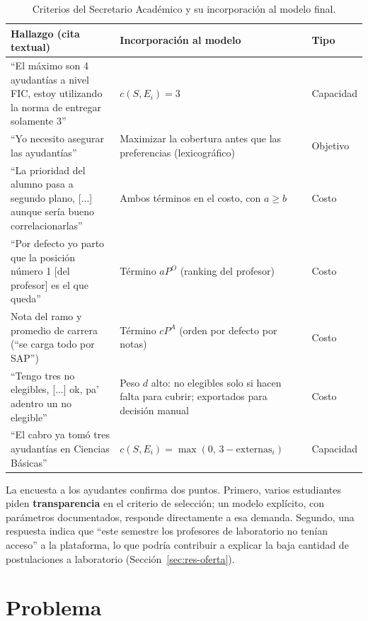 \documentclass{article}
\begin{document}
\begin{table}[H]
\centering
\small
\begin{tabularx}{\textwidth}{>{\raggedright\arraybackslash}X >{\raggedright\arraybackslash}X l}
\toprule
\textbf{Hallazgo (cita textual)} & \textbf{Incorporación al modelo} & \textbf{Tipo} \\
\midrule
``El máximo son 4 ayudantías a nivel FIC, estoy utilizando la norma de entregar solamente 3'' & $c(S, E_i) = 3$ & Capacidad \\
``Yo necesito asegurar las ayudantías'' & Maximizar la cobertura antes que las preferencias (lexicográfico) & Objetivo \\
``La prioridad del alumno pasa a segundo plano, [...] aunque sería bueno correlacionarlas'' & Ambos términos en el costo, con $a \ge b$ & Costo \\
``Por defecto yo parto que la posición número 1 [del profesor] es el que queda'' & Término $a P^O$ (ranking del profesor) & Costo \\
Nota del ramo y promedio de carrera (``se carga todo por SAP'') & Término $c P^A$ (orden por defecto por notas) & Costo \\
``Tengo tres no elegibles, [...] ok, pa' adentro un no elegible'' & Peso $d$ alto: no elegibles solo si hacen falta para cubrir; exportados para decisión manual & Costo \\
``El cabro ya tomó tres ayudantías en Ciencias Básicas'' & $c(S, E_i) = \max(0,\, 3 - \text{externas}_i)$ & Capacidad \\
\bottomrule
\end{tabularx}
\caption{Criterios del Secretario Académico y su incorporación al modelo final.}
\label{tab:hallazgos}
\end{table}

La encuesta a los ayudantes confirma dos puntos. Primero, varios estudiantes piden \textbf{transparencia} en el criterio de selección; un modelo explícito, con parámetros documentados, responde directamente a esa demanda. Segundo, una respuesta indica que ``este semestre los profesores de laboratorio no tenían acceso'' a la plataforma, lo que podría contribuir a explicar la baja cantidad de postulaciones a laboratorio (Sección~\ref{sec:res-oferta}).

\section{Problema}
\label{sec:problema}
\end{document}
